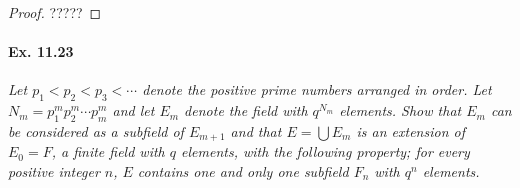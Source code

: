 \documentclass[11pt,a4paper]{article}
\begin{document}
\begin{proof}
?????
\end{proof}



\paragraph{Ex. 11.23}{\it Let $p_1<p_2<p_3<\cdots$ denote the positive prime numbers arranged in order. Let $N_m = p_1^mp_2^m\cdots p_m^m$ and let $E_m$ denote the field with $q^{N_m}$ elements. Show that $E_m$ can be considered as a subfield of $E_{m+1}$ and that $E = \bigcup E_m$ is an extension of $E_0 = F$, a finite field with $q$ elements, with the following property; for every positive integer $n$, $E$ contains one and only one subfield $F_n$ with $q^n$ elements.
}
\end{document}
